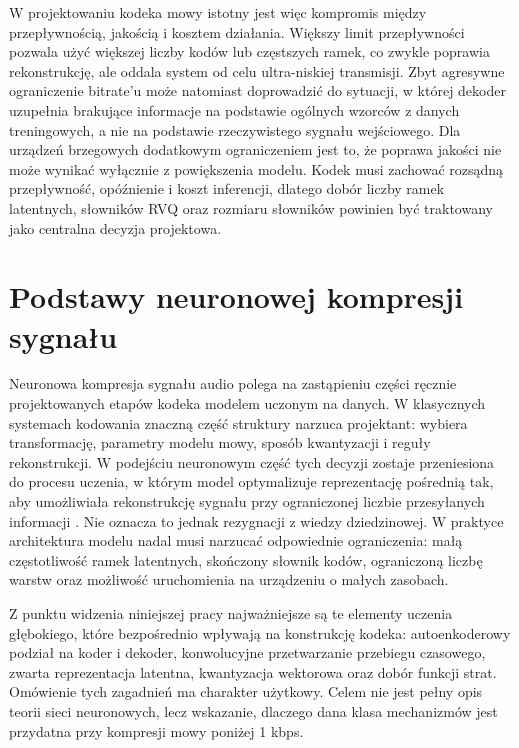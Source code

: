 W projektowaniu kodeka mowy istotny jest więc kompromis między przepływnością, jakością i kosztem działania. Większy limit przepływności pozwala użyć większej liczby kodów lub częstszych ramek, co zwykle poprawia rekonstrukcję, ale oddala system od celu ultra-niskiej transmisji. Zbyt agresywne ograniczenie bitrate'u może natomiast doprowadzić do sytuacji, w której dekoder uzupełnia brakujące informacje na podstawie ogólnych wzorców z danych treningowych, a nie na podstawie rzeczywistego sygnału wejściowego. Dla urządzeń brzegowych dodatkowym ograniczeniem jest to, że poprawa jakości nie może wynikać wyłącznie z powiększenia modelu. Kodek musi zachować rozsądną przepływność, opóźnienie i koszt inferencji, dlatego dobór liczby ramek latentnych, słowników RVQ oraz rozmiaru słowników powinien być traktowany jako centralna decyzja projektowa.

\section{Podstawy neuronowej kompresji sygnału}
\label{sec:podstawy-neuronowej-kompresji}

Neuronowa kompresja sygnału audio polega na zastąpieniu części ręcznie projektowanych etapów kodeka modelem uczonym na danych. W klasycznych systemach kodowania znaczną część struktury narzuca projektant: wybiera transformację, parametry modelu mowy, sposób kwantyzacji i reguły rekonstrukcji. W podejściu neuronowym część tych decyzji zostaje przeniesiona do procesu uczenia, w którym model optymalizuje reprezentację pośrednią tak, aby umożliwiała rekonstrukcję sygnału przy ograniczonej liczbie przesyłanych informacji \cite{Goodfellow2016DeepLearning,Zeghidour2021SoundStream,Defossez2022Encodec}. Nie oznacza to jednak rezygnacji z wiedzy dziedzinowej. W praktyce architektura modelu nadal musi narzucać odpowiednie ograniczenia: małą częstotliwość ramek latentnych, skończony słownik kodów, ograniczoną liczbę warstw oraz możliwość uruchomienia na urządzeniu o małych zasobach.

Z punktu widzenia niniejszej pracy najważniejsze są te elementy uczenia głębokiego, które bezpośrednio wpływają na konstrukcję kodeka: autoenkoderowy podział na koder i dekoder, konwolucyjne przetwarzanie przebiegu czasowego, zwarta reprezentacja latentna, kwantyzacja wektorowa oraz dobór funkcji strat. Omówienie tych zagadnień ma charakter użytkowy. Celem nie jest pełny opis teorii sieci neuronowych, lecz wskazanie, dlaczego dana klasa mechanizmów jest przydatna przy kompresji mowy poniżej 1 kbps.

